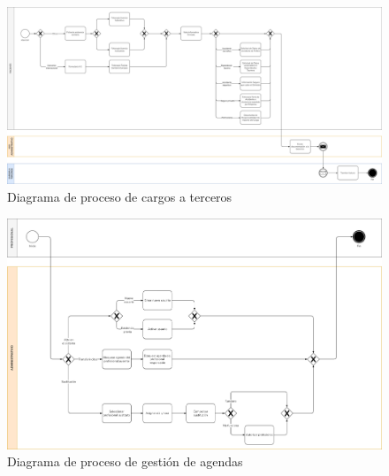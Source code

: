 \documentclass[12pt, a4paper, twoside, openright]{report}
\begin{document}
\begin{figure}
    \centering
    \begin{sideways}
        \includegraphics[width=0.95\textheight]{img/proceso-cargos.png}
    \end{sideways}
    \caption{Diagrama de proceso de cargos a terceros}
    \label{fig:proceso-cargos}
\end{figure}

\begin{figure}
    \centering
    \begin{sideways}
        \includegraphics[width=0.95\textheight]{img/proceso-agendas.png}
    \end{sideways}
    \caption{Diagrama de proceso de gestión de agendas}
    \label{fig:proceso-agendas}
\end{figure}

\printbibliography
\end{document}
